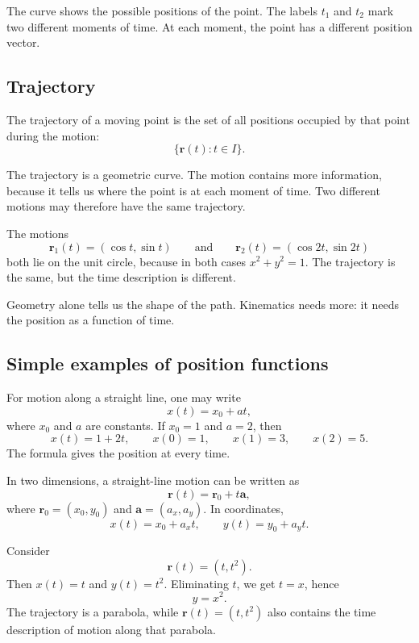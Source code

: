 The curve shows the possible positions of the point. The labels \(t_1\) and \(t_2\) mark two different moments of time. At each moment, the point has a different position vector.

\subsection{Trajectory}

\begin{definitionbox}
The trajectory of a moving point is the set of all positions occupied by that point during the motion:
\[
\{\mathbf{r}(t):t\in I\}.
\]
\end{definitionbox}

The trajectory is a geometric curve. The motion contains more information, because it tells us where the point is at each moment of time. Two different motions may therefore have the same trajectory.

\begin{examplebox}
The motions
\[
\mathbf{r}_1(t)=(\cos t,\sin t)
\qquad\text{and}\qquad
\mathbf{r}_2(t)=(\cos 2t,\sin 2t)
\]
both lie on the unit circle, because in both cases \(x^2+y^2=1\). The trajectory is the same, but the time description is different.
\end{examplebox}

Geometry alone tells us the shape of the path. Kinematics needs more: it needs the position as a function of time.

\subsection{Simple examples of position functions}

\begin{examplebox}
For motion along a straight line, one may write
\[
x(t)=x_0+at,
\]
where \(x_0\) and \(a\) are constants. If \(x_0=1\) and \(a=2\), then
\[
x(t)=1+2t,\qquad x(0)=1,\qquad x(1)=3,\qquad x(2)=5.
\]
The formula gives the position at every time.
\end{examplebox}

In two dimensions, a straight-line motion can be written as
\[
\mathbf{r}(t)=\mathbf{r}_0+t\mathbf{a},
\]
where \(\mathbf{r}_0=(x_0,y_0)\) and \(\mathbf{a}=(a_x,a_y)\). In coordinates,
\[
x(t)=x_0+a_xt,\qquad y(t)=y_0+a_yt.
\]

\begin{examplebox}
Consider
\[
\mathbf{r}(t)=(t,t^2).
\]
Then \(x(t)=t\) and \(y(t)=t^2\). Eliminating \(t\), we get \(t=x\), hence
\[
y=x^2.
\]
The trajectory is a parabola, while \(\mathbf{r}(t)=(t,t^2)\) also contains the time description of motion along that parabola.
\end{examplebox}

